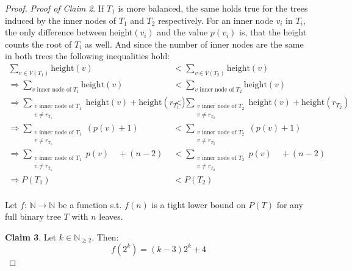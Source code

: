 \begin{proof}
\textit{Proof of Claim 2}. If $T_1$ is more balanced, the same holds true for the trees induced by the inner nodes of $T_1$ and $T_2$ respectively. For an inner node $v_i$ in $T_i$, the only difference between height$(v_i)$ and the value $p(v_i)$ is, that the height counts the root of $T_i$ as well. And since the number of inner nodes are the same in both trees the following inequalities hold:
\begin{align*}
\sum_{v \in V(T_1)} \text{height}(v) &< \sum_{v \in V(T_2)} \text{height}(v)\\
\Rightarrow \sum_{v \text{ inner node of }T_1} \text{height}(v) &< \sum_{v \text{ inner node of }T_2} \text{height}(v)\\
\Rightarrow \sum_{\substack{v \text{ inner node of }T_1 \\ v \neq r_{T_1}}} \text{height}(v) + \text{height}(r_{T_1}) &< \sum_{\substack{v \text{ inner node of }T_2 \\ v \neq r_{T_2}}} \text{height}(v) + \text{height}(r_{T_2}) \\
\Rightarrow \sum_{\substack{v \text{ inner node of }T_1 \\ v \neq r_{T_1}}} (p(v)+1) &< \sum_{\substack{v \text{ inner node of }T_2 \\ v \neq r_{T_2}}} (p(v)+1)\\
\Rightarrow \sum_{\substack{v \text{ inner node of }T_1 \\ v \neq r_{T_1}}} p(v) \quad +(n-2) &< \sum_{\substack{v \text{ inner node of }T_2 \\ v \neq r_{T_2}}} p(v) \quad +(n-2)\\
\Rightarrow P(T_1) &< P(T_2) \\
\end{align*}

Let $f: \, \mathbb{N} \to \mathbb{N}$ be a function s.t. $f(n)$ is a tight lower bound on $P(T)$ for any full binary tree $T$ with $n$ leaves.

\textbf{Claim 3}. Let $k \in \mathbb{N}_{\geq 2}$. Then:
$$f(2^k) = (k-3)2^k + 4$$


\end{proof}
